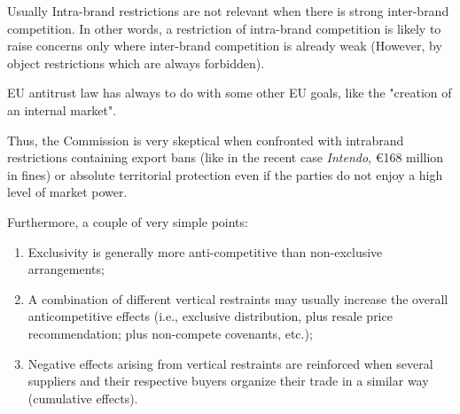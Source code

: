        Usually Intra-brand restrictions are not relevant when there is strong inter-brand competition. In other words, a restriction of intra-brand competition is likely to raise concerns only where inter-brand competition is already weak (However, by object restrictions which are always forbidden). 


        EU antitrust law has always to do with some other EU goals, like the "creation of an internal market".

        Thus, the Commission is very skeptical when confronted with intrabrand restrictions containing export bans (like in the recent case \emph{Intendo}, €168 million in fines) or absolute territorial protection even if the parties do not enjoy a high level of market power.
        
        
        Furthermore, a couple of very simple points:
        
        \begin{enumerate}[label=(\alph*)]
            \item Exclusivity is generally more anti-competitive than non-exclusive arrangements;
            \item A combination of different vertical restraints may usually increase the overall anticompetitive effects (i.e., exclusive distribution, plus resale price recommendation; plus non-compete covenants, etc.);
            \item Negative effects arising from vertical restraints are reinforced when several suppliers and their respective buyers organize their trade in a similar way (cumulative effects).
        \end{enumerate}

